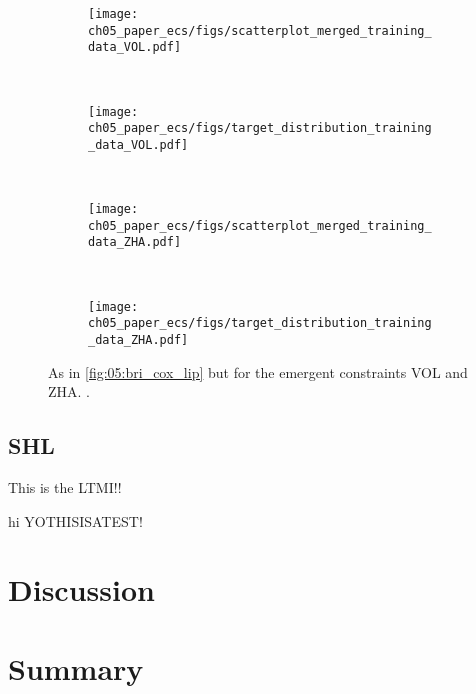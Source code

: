 \begin{figure}[p]
  \centering
  \begin{subfigure}[b]{\SubfigureWidth{}}
    \texttt{[image: 
      ch05\_paper\_ecs/figs/scatterplot\_merged\_training\_data\_VOL.pdf]}
    \caption{}
    \label{fig:05:vol_zha:a}
  \end{subfigure}
  ~
  \begin{subfigure}[b]{\SubfigureWidth{}}
    \texttt{[image: 
      ch05\_paper\_ecs/figs/target\_distribution\_training\_data\_VOL.pdf]}
    \caption{}
    \label{fig:05:vol_zha:b}
  \end{subfigure}
  \\
  \begin{subfigure}[b]{\SubfigureWidth{}}
    \texttt{[image: 
      ch05\_paper\_ecs/figs/scatterplot\_merged\_training\_data\_ZHA.pdf]}
    \caption{}
    \label{fig:05:vol_zha:c}
  \end{subfigure}
  ~
  \begin{subfigure}[b]{\SubfigureWidth{}}
    \texttt{[image: 
      ch05\_paper\_ecs/figs/target\_distribution\_training\_data\_ZHA.pdf]}
    \caption{}
    \label{fig:05:vol_zha:d}
  \end{subfigure}
  \caption{As in \cref{fig:05:bri_cox_lip} but for the emergent constraints
    VOL and ZHA. .}
  \label{fig:05:vol_zha}
\end{figure}

\subsection{SHL}
\label{subsec:05:shl}

This is the \ac{LTMI}!!

\begin{center}
  \newcommand{\testiii}{YOTHISISATEST!}
  hi
  \testiii{}
\end{center}


\section{Discussion}
\label{sec:05:discussion}


\section{Summary}
\label{sec:05:summary}
